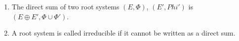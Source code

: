 \begin{enumerate}[label=(\alph*)]
	\item The direct sum of two root systems $(E, \Phi)$, $(E', Phi')$ is
$(E\oplus E', \Phi \cup \Phi')$.
\item A root system is called irreducible if it cannot be written as a direct sum.
\end{enumerate}
